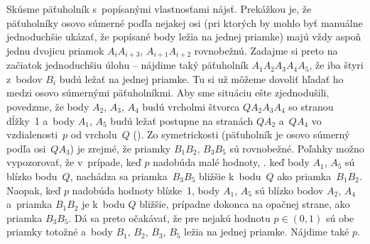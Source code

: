 {%
Skúsme päťuholník s~popísanými vlastnosťami nájsť. Prekážkou je, že päťuholníky osovo súmerné podľa nejakej osi (pri ktorých by mohlo byť manuálne jednoduchšie ukázať, že popísané body ležia na jednej priamke) majú vždy aspoň jednu dvojicu priamok $A_iA_{i+3}$, $A_{i+1}A_{i+2}$ rovnobežnú. Zadajme si preto na začiatok jednoduchšiu úlohu -- nájdime taký päťuholník $A_1A_2A_3A_4A_5$, že iba štyri z~bodov $B_i$ budú ležať na jednej priamke. Tu si už môžeme dovoliť hľadať ho medzi osovo súmernými päťuholníkmi. Aby sme situáciu ešte zjednodušili, povedzme, že body $A_2$, $A_3$, $A_4$ budú vrcholmi štvorca $QA_2A_3A_4$ so stranou dĺžky~1 a~body $A_1$, $A_5$ budú ležať postupne na stranách $QA_2$ a~$QA_4$ vo vzdialenosti~$p$ od vrcholu~$Q$ (\obr).
%
Zo symetrickosti (päťuholník je osovo súmerný podľa osi~$QA_3$) je zrejmé, že priamky $B_1B_2$, $B_3B_5$ sú rovnobežné. Poľahky možno vypozorovať, že v~prípade, keď $p$ nadobúda malé hodnoty, \tj. keď body $A_1$, $A_5$ sú blízko bodu~$Q$, nachádza sa priamka~$B_3B_5$ bližšie k~bodu~$Q$ ako priamka~$B_1B_2$. Naopak, keď $p$ nadobúda hodnoty blízke~1, body $A_1$, $A_5$ sú blízko bodov $A_2$, $A_4$ a~priamka $B_1B_2$ je k~bodu $Q$ bližšie, prípadne dokonca na opačnej strane, ako priamka $B_3B_5$. Dá sa preto očakávať, že pre nejakú hodnotu $p\in(0,1)$ sú obe priamky totožné a~body $B_1$, $B_2$, $B_3$, $B_5$ ležia na jednej priamke. Nájdime také $p$.

}
